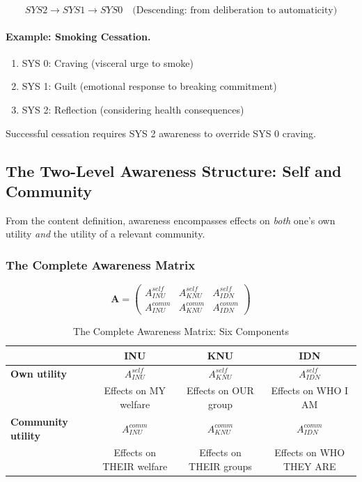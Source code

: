 \begin{equation}
SYS2 \rightarrow SYS1 \rightarrow SYS0 \quad \text{(Descending: from deliberation to automaticity)}
\end{equation}

\paragraph{Example: Smoking Cessation.}
\begin{enumerate}
\item SYS 0: Craving (visceral urge to smoke)
\item SYS 1: Guilt (emotional response to breaking commitment)
\item SYS 2: Reflection (considering health consequences)
\end{enumerate}

Successful cessation requires SYS 2 awareness to override SYS 0 craving.

\subsection{The Two-Level Awareness Structure: Self and Community}
\label{subsec:two-level-structure}

From the content definition, awareness encompasses effects on \emph{both}
one's own utility \emph{and} the utility of a relevant community.

\subsubsection{The Complete Awareness Matrix}

\begin{equation}
\boxed{
\mathbf{A} = \begin{pmatrix}
A^{self}_{INU} & A^{self}_{KNU} & A^{self}_{IDN} \\
A^{comm}_{INU} & A^{comm}_{KNU} & A^{comm}_{IDN}
\end{pmatrix}
}
\label{eq:awareness-matrix}
\end{equation}

\begin{table}[htbp]
\centering
\caption{The Complete Awareness Matrix: Six Components}
\label{tab:awareness-matrix-complete}
\renewcommand{\arraystretch}{1.5}
\begin{tabular}{@{}l|ccc@{}}
\toprule
& \textbf{INU} & \textbf{KNU} & \textbf{IDN} \\
\midrule
\textbf{Own utility} & $A^{self}_{INU}$ & $A^{self}_{KNU}$ & $A^{self}_{IDN}$ \\
& Effects on MY welfare & Effects on OUR group & Effects on WHO I AM \\
\midrule
\textbf{Community utility} & $A^{comm}_{INU}$ & $A^{comm}_{KNU}$ & $A^{comm}_{IDN}$ \\
& Effects on THEIR welfare & Effects on THEIR groups & Effects on WHO THEY ARE \\
\bottomrule
\end{tabular}
\end{table}


